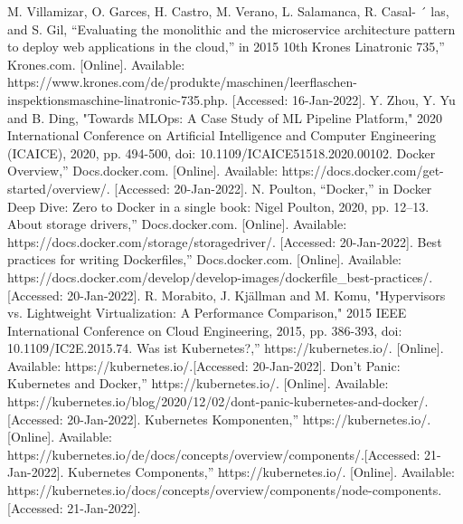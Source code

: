 \documentclass[12pt,oneside]{report}
\begin{document}
 
  \begin{thebibliography}{10}
     M. Villamizar, O. Garces, H. Castro, M. Verano, L. Salamanca, R. Casal- ´
    las, and S. Gil, “Evaluating the monolithic and the microservice architecture pattern to deploy web applications in the cloud,” in 2015 10th
     Krones Linatronic 735,” Krones.com. [Online].
    Available: https://www.krones.com/de/produkte/maschinen/leerflaschen-inspektionsmaschine-linatronic-735.php. [Accessed: 16-Jan-2022].
     Y. Zhou, Y. Yu and B. Ding, "Towards MLOps: A Case Study of ML Pipeline Platform," 2020 International Conference on Artificial Intelligence and Computer Engineering (ICAICE), 2020, pp. 494-500, doi: 10.1109/ICAICE51518.2020.00102.
     Docker Overview,” Docs.docker.com. [Online].
    Available: https://docs.docker.com/get-started/overview/. [Accessed: 20-Jan-2022].
    N. Poulton, “Docker,” in Docker Deep Dive: Zero to Docker in a single book: Nigel Poulton, 2020, pp. 12–13. 
     About storage drivers,” Docs.docker.com. [Online].
    Available: https://docs.docker.com/storage/storagedriver/. [Accessed: 20-Jan-2022].
     Best practices for writing Dockerfiles,” Docs.docker.com. [Online]. 
    Available: https://docs.docker.com/develop/develop-images/dockerfile\_best-practices/.[Accessed: 20-Jan-2022].
     R. Morabito, J. Kjällman and M. Komu, "Hypervisors vs. Lightweight Virtualization: A Performance Comparison," 2015 IEEE International Conference on Cloud Engineering, 2015, pp. 386-393, doi: 10.1109/IC2E.2015.74.
     Was ist Kubernetes?,” https://kubernetes.io/. [Online]. 
    Available: https://kubernetes.io/.[Accessed: 20-Jan-2022].
     Don't Panic: Kubernetes and Docker,” https://kubernetes.io/. [Online]. 
    Available: https://kubernetes.io/blog/2020/12/02/dont-panic-kubernetes-and-docker/.[Accessed: 20-Jan-2022].
     Kubernetes Komponenten,” https://kubernetes.io/. [Online]. 
    Available: https://kubernetes.io/de/docs/concepts/overview/components/.[Accessed: 21-Jan-2022].
     Kubernetes Components,” https://kubernetes.io/. [Online]. 
    Available: https://kubernetes.io/docs/concepts/overview/components/node-components.[Accessed: 21-Jan-2022].

\end{thebibliography}
\end{document}
